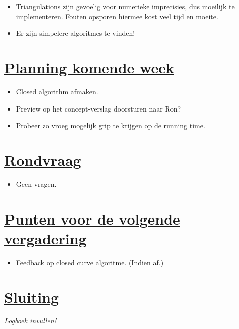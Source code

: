 \documentclass[a4paper]{article}
\begin{document}
\begin{itemize}
\item Triangulations zijn gevoelig voor numerieke imprecisies, dus moeilijk te implementeren. Fouten opsporen hiermee kost veel tijd en moeite.
\item Er zijn simpelere algoritmes te vinden!
\end{itemize}


\section{\underline{Planning komende week}} %
\label{sec:planning_komende_week}

\begin{itemize}
\item Closed algorithm afmaken.
\item Preview op het concept-verslag doorsturen naar Ron?
\item Probeer zo vroeg mogelijk grip te krijgen op de running time.
\end{itemize}


\section{\underline{Rondvraag}} %
\label{sec:rondvraag}

\begin{itemize}
\item Geen vragen.
\end{itemize}


\section{\underline{Punten voor de volgende vergadering}} %
\label{sec:punten_voor_de_volgende_vergadering}

\begin{itemize}
\item Feedback op closed curve algoritme. (Indien af.)
\end{itemize}


\section{\underline{Sluiting}} %
\label{sec:sluiting}
\small{\emph{Logboek invullen!}}

\end{document}
